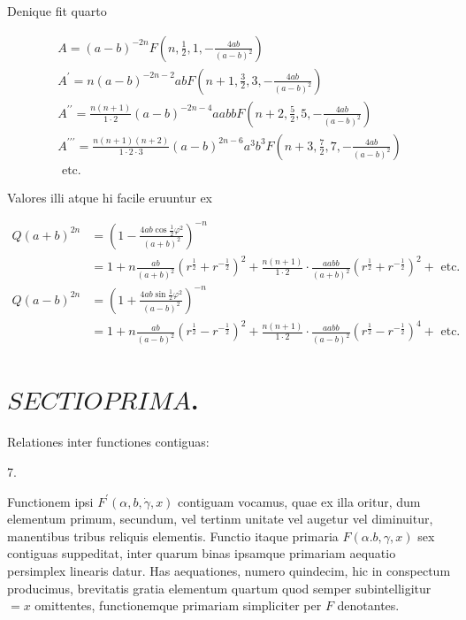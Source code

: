 \documentclass[10pt]{article}
\begin{document}
Denique fit quarto

\[
\begin{gathered}
A=(a-b)^{-2 n} F\left(n, \frac{1}{2}, 1,-\frac{4 a b}{(a-b)^{2}}\right) \\
A^{\prime}=n(a-b)^{-2 n-2} a b F\left(n+1, \frac{3}{2}, 3,-\frac{4 a b}{(a-b)^{2}}\right) \\
A^{\prime \prime}=\frac{n(n+1)}{1 \cdot 2}(a-b)^{-2 n-4} a a b b F\left(n+2, \frac{5}{2}, 5,-\frac{4 a b}{(a-b)^{2}}\right) \\
A^{\prime \prime \prime}=\frac{n(n+1)(n+2)}{1 \cdot 2 \cdot 3}(a-b)^{2 n-6} a^{3} b^{3} F\left(n+3, \frac{7}{2}, 7,-\frac{4 a b}{(a-b)^{2}}\right) \\
\text { etc. }
\end{gathered}
\]

Valores illi atque hi facile eruuntur ex

\[
\begin{aligned}
Q(a+b)^{2 n} & =\left(1-\frac{4 a b \cos \frac{1}{2} \varphi^{2}}{(a+b)^{2}}\right)^{-n} \\
& =1+n \frac{a b}{(a+b)^{2}}\left(r^{\frac{1}{2}}+r^{-\frac{1}{2}}\right)^{2}+\frac{n(n+1)}{1 \cdot 2} \cdot \frac{a a b b}{(a+b)^{2}}\left(r^{\frac{1}{2}}+r^{-\frac{1}{2}}\right)^{2}+\text { etc. } \\
Q(a-b)^{2 n} & =\left(1+\frac{4 a b \sin \frac{1}{2} \varphi^{2}}{(a-b)^{2}}\right)^{-n} \\
& =1+n \frac{a b}{(a-b)^{2}}\left(r^{\frac{1}{2}}-r^{-\frac{1}{2}}\right)^{2}+\frac{n(n+1)}{1 \cdot 2} \cdot \frac{a a b b}{(a-b)^{2}}\left(r^{\frac{1}{2}}-r^{-\frac{1}{2}}\right)^{4}+\text { etc. }
\end{aligned}
\]

\section*{\(S E C T I O P R I M A\).}
Relationes inter functiones contiguas:

7.

Functionem ipsi \(F^{\prime}(\alpha, b, \dot{\gamma}, x)\) contiguam vocamus, quae ex illa oritur, dum elementum primum, secundum, vel tertinm unitate vel augetur vel diminuitur, manentibus tribus reliquis elementis. Functio itaque primaria \(F(\alpha . b, \gamma, x)\) sex contiguas suppeditat, inter quarum binas ipsamque primariam aequatio persimplex linearis datur. Has aequationes, numero quindecim, hic in conspectum producimus, brevitatis gratia elementum quartum quod semper subintelligitur \(=x\) omittentes, functionemque primariam simpliciter per \(F\) denotantes.
\end{document}

